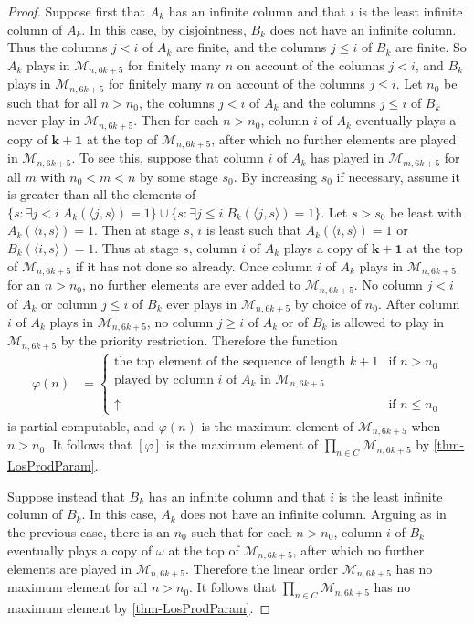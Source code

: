 \documentclass[11pt,a4paper,reqno]{amsart}
\theoremstyle{definition}
\newcommand{\la}{\langle}
\newcommand{\ra}{\rangle}
\newcommand{\ua}{{\uparrow}}
\newcommand{\mc}[1]{\mathcal{#1}}
\begin{document}
\begin{proof}
Suppose first that $A_k$ has an infinite column and that $i$ is the least infinite column of $A_k$.  In this case, by disjointness, $B_k$ does not have an infinite column.  Thus the columns $j < i$ of $A_k$ are finite, and the columns $j \leq i$ of $B_k$ are finite.  So $A_k$ plays in $\mc{M}_{n, 6k+5}$ for finitely many $n$ on account of the columns $j < i$, and $B_k$ plays in $\mc{M}_{n, 6k+5}$ for finitely many $n$ on account of the columns $j \leq i$.  Let $n_0$ be such that for all $n > n_0$, the columns $j < i$ of $A_k$ and the columns $j \leq i$ of $B_k$ never play in $\mc{M}_{n, 6k+5}$.  Then for each $n > n_0$, column $i$ of $A_k$ eventually plays a copy of $\bm{k+1}$ at the top of $\mc{M}_{n, 6k+5}$, after which no further elements are played in $\mc{M}_{n, 6k+5}$.  To see this, suppose that column $i$ of $A_k$ has played in $\mc{M}_{m, 6k+5}$ for all $m$ with $n_0 < m < n$ by some stage $s_0$.  By increasing $s_0$ if necessary, assume it is greater than all the elements of $\{s : \exists j < i\; A_k(\la j, s \ra) = 1\} \cup \{s : \exists j \leq i\; B_k(\la j, s \ra) = 1\}$.  Let $s > s_0$ be least with $A_k(\la i, s \ra)=1$.  Then at stage $s$, $i$ is least such that $A_k(\la i, s \ra)=1$ or $B_k(\la i, s \ra)=1$.  Thus at stage $s$, column $i$ of $A_k$ plays a copy of $\bm{k+1}$ at the top of $\mc{M}_{n, 6k+5}$ if it has not done so already.  Once column $i$ of $A_k$ plays in $\mc{M}_{n, 6k+5}$ for an $n > n_0$, no further elements are ever added to $\mc{M}_{n, 6k+5}$.  No column $j < i$ of $A_k$ or column $j \leq i$ of $B_k$ ever plays in $\mc{M}_{n, 6k+5}$ by choice of $n_0$.  After column $i$ of $A_k$ plays in $\mc{M}_{n, 6k+5}$, no column $j \geq i$ of $A_k$ or of $B_k$ is allowed to play in $\mc{M}_{n, 6k+5}$ by the priority restriction.  Therefore the function
\begin{align*}
\varphi(n) &=
\begin{cases}
\text{the top element of the sequence of length $k+1$} & \text{if $n > n_0$}\\
\text{played by column $i$ of $A_k$ in $\mc{M}_{n, 6k+5}$}\\ \\
\ua & \text{if $n \leq n_0$}
\end{cases}
\end{align*}
is partial computable, and $\varphi(n)$ is the maximum element of $\mc{M}_{n, 6k+5}$ when $n > n_0$.  It follows that $[\varphi]$ is the maximum element of $\prod_{n \in C} \mc{M}_{n, 6k+5}$ by \cref{thm-LosProdParam}.

Suppose instead that $B_k$ has an infinite column and that $i$ is the least infinite column of $B_k$.  In this case, $A_k$ does not have an infinite column.  Arguing as in the previous case, there is an $n_0$ such that for each $n > n_0$, column $i$ of $B_k$ eventually plays a copy of $\omega$ at the top of $\mc{M}_{n, 6k+5}$, after which no further elements are played in $\mc{M}_{n, 6k+5}$.  Therefore the linear order $\mc{M}_{n, 6k+5}$ has no maximum element for all $n > n_0$.  It follows that $\prod_{n \in C} \mc{M}_{n, 6k+5}$ has no maximum element by \cref{thm-LosProdParam}.


\end{proof}
\end{document}
